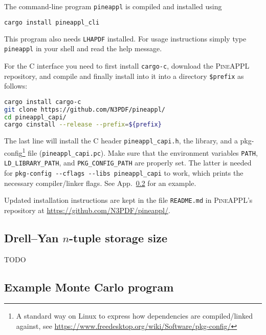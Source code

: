 The command-line program \texttt{pineappl} is compiled and installed using
\begin{lstlisting}[language=bash]
cargo install pineappl_cli
\end{lstlisting}
This program also needs \texttt{LHAPDF} installed.
For usage instructions simply type \texttt{pineappl} in your shell and read the help message.

For the C interface you need to first install \texttt{cargo-c}, download the \textsc{PineAPPL} repository, and compile and finally install into it into a directory \texttt{\$prefix} as follows:
\begin{lstlisting}[language=bash]
cargo install cargo-c
git clone https://github.com/N3PDF/pineappl/
cd pineappl_capi/
cargo cinstall --release --prefix=${prefix}
\end{lstlisting}
The last line will install the C header \texttt{pineappl\_capi.h}, the library, and a pkg-config\footnote{A standard way on Linux to express how dependencies are compiled/linked against, see \url{https://www.freedesktop.org/wiki/Software/pkg-config/}} file (\texttt{pineappl\_capi.pc}).
Make sure that the environment variables \texttt{PATH}, \texttt{LD\_LIBRARY\_PATH}, and \texttt{PKG\_CONFIG\_PATH} are properly set.
The latter is needed for \texttt{pkg-config -{}-cflags -{}-libs pineappl\_capi} to work, which prints the necessary compiler/linker flags.
See App.~\ref{app:example-program} for an example.

Updated installation instructions are kept in the file \texttt{README.md} in \textsc{PineAPPL}'s repository at \url{https://github.com/N3PDF/pineappl/}.

\subsection{Drell--Yan \texorpdfstring{$n$}{n}-tuple storage size}
\label{app:drell-yan-storage}

TODO

\subsection{Example Monte Carlo program}
\label{app:example-program}




